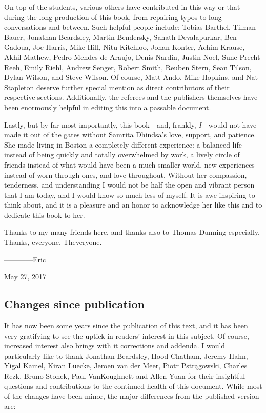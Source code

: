 On top of the students, various others have contributed in this way or that during the long production of this book, from repairing typos to long conversations and between.  Such helpful people include: Tobias Barthel, Tilman Bauer, Jonathan Beardsley, Martin Bendersky, Sanath Devalapurkar, Ben Gadoua, Joe Harris, Mike Hill, Nitu Kitchloo, Johan Konter, Achim Krause, Akhil Mathew, Pedro Mendes de Araujo, Denis Nardin, Justin Noel, Sune Precht Reeh, Emily Riehl, Andrew Senger, Robert Smith, Reuben Stern, Sean Tilson, Dylan Wilson, and Steve Wilson.  Of course, Matt Ando, Mike Hopkins, and Nat Stapleton deserve further special mention as direct contributors of their respective sections.  Additionally, the referees and the publishers themselves have been enormously helpful in editing this into a passable document.

Lastly, but by far most importantly, this book---and, frankly, \emph{I}---would not have made it out of the gates without Samrita Dhindsa's love, support, and patience.  She made living in Boston a completely different experience: a balanced life instead of being quickly and totally overwhelmed by work, a lively circle of friends instead of what would have been a much smaller world, new experiences instead of worn-through ones, and love throughout.  Without her compassion, tenderness, and understanding I would not be half the open and vibrant person that I am today, and I would know so much less of myself.  It is awe-inspiring to think about, and it is a pleasure and an honor to acknowledge her like this and to dedicate this book to her.

Thanks to my many friends here, and thanks also to Thomas Dunning especially.  Thanks, everyone.  Theveryone.

\vspace{2\baselineskip}
\hspace{3em} ------------Eric

\hspace{7em} May 27{\th}, 2017






\cleardoublepage

\subsection*{Changes since publication}

It has now been some years since the publication of this text, and it has been very gratifying to see the uptick in readers' interest in this subject.  Of course, increased interest also brings with it corrections and addenda.  I would particularly like to thank Jonathan Beardsley, Hood Chatham, Jeremy Hahn, Yigal Kamel, Kiran Luecke, Jeroen van der Meer, Piotr Pstr\k{a}gowski, Charles Rezk, Bruno Stonek, Paul VanKoughnett and Allen Yuan for their insightful questions and contributions to the continued health of this document.  While most of the changes have been minor, the major differences from the published version are:

